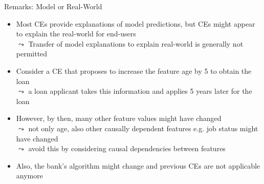 \documentclass[11pt,compress,t,notes=noshow, aspectratio=169, xcolor=table, usenames,dvipsnames]{beamer}
\begin{document}
\begin{frame}[c]{Remarks: Model or Real-World}

	\begin{itemize}[<+->]
	\item Most CEs provide explanations of model predictions, but CEs might appear to explain the real-world for end-users\\
$\leadsto$ Transfer of model explanations to explain real-world is generally not permitted
	\item Consider a CE that proposes to increase the feature age by 5 to obtain the loan\\
	$\leadsto$ a loan applicant takes this information and applies 5 years later for the loan
	\item However, by then, many 
	other feature values 
	might have changed\\
	$\leadsto$ not only age, also other causally dependent features e.g. job status might have changed \\%
	$\leadsto$  avoid this by considering causal dependencies between features
	\item Also, the bank's algorithm might change and previous CEs are not applicable anymore
	\end{itemize}
\end{frame}


\endlecture
\end{document}

